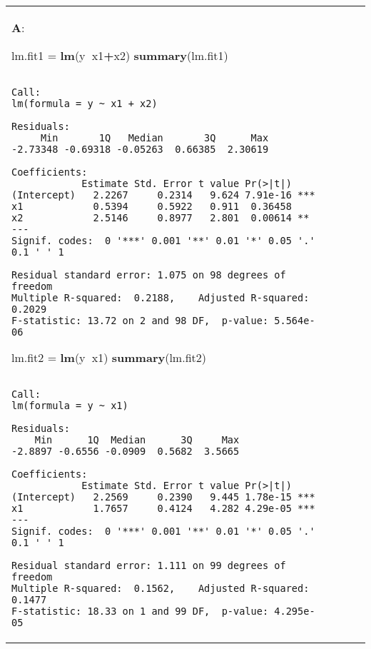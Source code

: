 \documentclass[12pt,]{article}
\newenvironment{Shaded}{\begin{snugshade}}{\end{snugshade}}
\newcommand{\KeywordTok}[1]{\textcolor[rgb]{0.13,0.29,0.53}{\textbf{#1}}}
\newcommand{\NormalTok}[1]{#1}
\newcommand{\OperatorTok}[1]{\textcolor[rgb]{0.81,0.36,0.00}{\textbf{#1}}}
\newcommand{\StringTok}[1]{\textcolor[rgb]{0.31,0.60,0.02}{#1}}
\begin{document}
\begin{tabularx}{0.5\textwidth}{p{} p{} p{} p{}}
\textbf{A}:

\begin{Shaded}
\begin{Highlighting}[]
\NormalTok{lm.fit1 =}\StringTok{ }\KeywordTok{lm}\NormalTok{(y}\OperatorTok{~}\NormalTok{x1}\OperatorTok{+}\NormalTok{x2)}
\KeywordTok{summary}\NormalTok{(lm.fit1)}
\end{Highlighting}
\end{Shaded}

\begin{verbatim}

Call:
lm(formula = y ~ x1 + x2)

Residuals:
     Min       1Q   Median       3Q      Max 
-2.73348 -0.69318 -0.05263  0.66385  2.30619 

Coefficients:
            Estimate Std. Error t value Pr(>|t|)    
(Intercept)   2.2267     0.2314   9.624 7.91e-16 ***
x1            0.5394     0.5922   0.911  0.36458    
x2            2.5146     0.8977   2.801  0.00614 ** 
---
Signif. codes:  0 '***' 0.001 '**' 0.01 '*' 0.05 '.' 0.1 ' ' 1

Residual standard error: 1.075 on 98 degrees of freedom
Multiple R-squared:  0.2188,    Adjusted R-squared:  0.2029 
F-statistic: 13.72 on 2 and 98 DF,  p-value: 5.564e-06
\end{verbatim}

\begin{Shaded}
\begin{Highlighting}[]
\NormalTok{lm.fit2 =}\StringTok{ }\KeywordTok{lm}\NormalTok{(y}\OperatorTok{~}\NormalTok{x1)}
\KeywordTok{summary}\NormalTok{(lm.fit2)}
\end{Highlighting}
\end{Shaded}

\begin{verbatim}

Call:
lm(formula = y ~ x1)

Residuals:
    Min      1Q  Median      3Q     Max 
-2.8897 -0.6556 -0.0909  0.5682  3.5665 

Coefficients:
            Estimate Std. Error t value Pr(>|t|)    
(Intercept)   2.2569     0.2390   9.445 1.78e-15 ***
x1            1.7657     0.4124   4.282 4.29e-05 ***
---
Signif. codes:  0 '***' 0.001 '**' 0.01 '*' 0.05 '.' 0.1 ' ' 1

Residual standard error: 1.111 on 99 degrees of freedom
Multiple R-squared:  0.1562,    Adjusted R-squared:  0.1477 
F-statistic: 18.33 on 1 and 99 DF,  p-value: 4.295e-05
\end{verbatim}


\end{tabularx}
\end{document}
